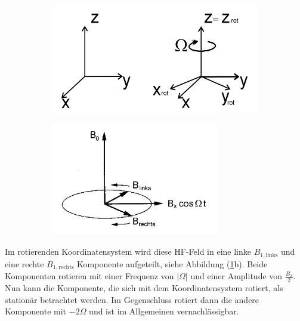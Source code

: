 \begin{figure}[hbtp]
\caption{Rotierendes Koordinatensystem.}
\centering
	\begin{subfigure}[t]{0.35\textwidth}
	\includegraphics[width=\textwidth]{Plots/rotKoordinatensystem.png} 
	\end{subfigure}
	\qquad
	\qquad
	\begin{subfigure}[t]{0.35\textwidth}
	\includegraphics[width=0.8\textwidth]{Plots/B1Felder.png}
	\end{subfigure}
\label{rotKoordi}
\end{figure}
Im rotierenden Koordinatensystem wird diese HF-Feld in eine linke $B_{1,\text{links}}$ und eine rechte $B_{1,\text{rechts}}$ Komponente aufgeteilt, siehe Abbildung (\ref{rotKoordi}b).
Beide Komponenten rotieren mit einer Frequenz von $|\Omega|$ und einer Amplitude von $\frac{B_x}{2}$.
Nun kann die Komponente, die sich mit dem Koordinatensystem rotiert, als station\"{a}r betrachtet werden.
Im Gegenschluss rotiert dann die andere Komponente mit $-2\Omega$ und ist im Allgemeinen vernachl\"{a}ssigbar.

